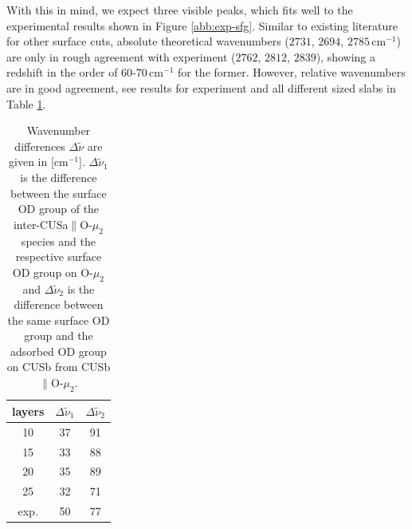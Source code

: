 \documentclass[11pt,DIV=13,BCOR=5mm,a4paper,headinclude]{scrbook}
\begin{document}
With this in mind, we expect three visible peaks, which fits well to the experimental results shown in Figure \ref{abb:exp-sfg}.
Similar to existing literature for other surface cuts\cite{Wirth2014}, absolute theoretical wavenumbers ($2731$, $2694$, $2785\,$cm$^{-1}$) are only in rough agreement with experiment ($2762$, $2812$, $2839$), showing a redshift in the order of $60$-$70\,$cm$^{-1}$ for the former.
However, relative wavenumbers are in good agreement, see results for experiment and all different sized slabs in Table \ref{tab:rel_modes}.
\begin{table}[!h]
\begin{center}
\caption{Wavenumber differences $\Delta \tilde{\nu}$ are given in [cm$^{-1}$].
$\Delta \tilde{\nu}_1$ is the difference between the surface OD group of the inter-CUSa$\parallel$O-$\mu_2$ species and the respective surface OD group on O-$\mu_2$ and  $\Delta \tilde{\nu}_2$ is the difference between the same surface OD group and the adsorbed OD group on CUSb from CUSb$\parallel$O-$\mu_2$.}
\begin{tabular}{ccc}
\toprule
layers & $\Delta \tilde{\nu}_1$ &  $\Delta \tilde{\nu}_2$\\\midrule
10  &37 &91 \\
15  &33 &88 \\
20  &35 &89 \\
25  &32 &71 \\\midrule
exp.&50 &77 \\\bottomrule
  \end{tabular}
\label{tab:rel_modes}
\end{center}
\end{table}
\\
\\

\end{document}
